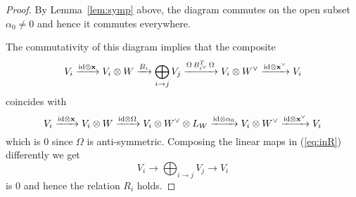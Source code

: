 \documentclass{amsart}
\theoremstyle{definition}
\begin{document}
\begin{proof}
By Lemma~\ref{lem:symp} above, the diagram commutes on the open subset $\alpha_0 \neq 0$ and hence it commutes everywhere.

The commutativity of this diagram implies that the composite 
\begin{equation}\label{eq:inR}
    V_{i} \xrightarrow{\textup{id} \otimes \mathbf{x}} V_{i} \otimes W \xrightarrow{B_{i}} \bigoplus_{i \rightarrow j} V_j \xrightarrow{\Omega\,B_{i^\vee}^T \, \Omega} V_{i} \otimes W^\vee \xrightarrow{\textup{id} \otimes \mathbf{x}^\vee} V_i
\end{equation}
coincides with
$$V_i \xrightarrow{\textup{id} \otimes \mathbf{x}} V_i \otimes W \xrightarrow{\textup{id} \otimes \Omega} V_i \otimes W^\vee \otimes L_W \xrightarrow{\textup{id} \otimes \alpha_0} V_i \otimes W^\vee \xrightarrow {\textup{id} \otimes \mathbf{x}^\vee} V_i$$ 
which is $0$ since $\Omega$ is anti-symmetric.
Composing the linear maps in (\ref{eq:inR}) differently we get $$V_i \longrightarrow \bigoplus_{i \rightarrow j} V_j \longrightarrow V_i$$
is 0 and hence the relation $R_i$ holds.
\end{proof}




\end{document}
